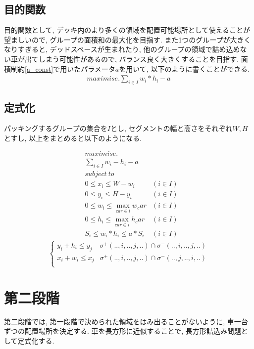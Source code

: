 \subsection{目的関数}
目的関数として, デッキ内のより多くの領域を配置可能場所として使えることが望ましいので, グループの面積和の最大化を目指す. 
また1つのグループが大きくなりすぎると, デッドスペースが生まれたり, 他のグループの領域で詰め込めない車が出てしまう可能性があるので, バランス良く大きくすることを目指す. 
面積制約\ref{a_const}で用いたパラメータ$a$を用いて, 以下のように書くことができる. \\
\begin{eqnarray}
    maximise. \sum_{i \in I} w_i*h_i  - a
\end{eqnarray}
\subsection{定式化}
パッキングするグループの集合を$I$とし, セグメントの幅と高さをそれぞれ$W, H$とすし, 以上をまとめると以下のようになる. \\
\begin{center}
    \begin{align}
        & maximise. \nonumber \\
        & \sum_{i \in I} w_i - h_i - a \\
        & subject\  to \nonumber \\
        & 0 \leq x_i \leq W - w_i & (i \in I) \\
        & 0 \leq y_i \leq H - y_i & (i \in I) \\
        & 0 \leq w_i \leq \max_{car \in i}w_car & (i \in I) \\
        & 0 \leq h_i \leq \max_{car \in i}h_car & (i \in I) \\
        & S_i \leq w_i*h_i \leq a*S_i &(i \in I)
    \end{align}
    \begin{eqnarray}
        \left\{
            \begin{array}{ll}
                y_i + h_i \leq y_j & \sigma^+(..,i,..,j,..) \cap \sigma^-(..,i,..,j,..) \\
                x_i + w_i \leq x_j & \sigma^+(..,i,..,j,..) \cap \sigma^-(..,j,..,i,..) \\
            \end{array}
        \right.
    \end{eqnarray}
\end{center}

\section{第二段階}
第二段階では, 第一段階で決められた領域をはみ出ることがないように, 車一台ずつの配置場所を決定する. 
車を長方形に近似することで, 長方形詰込み問題として定式化する. 

